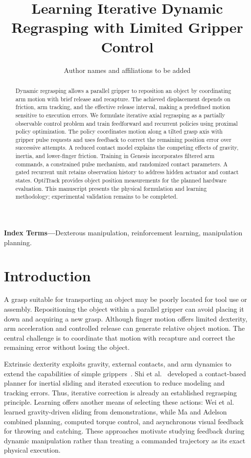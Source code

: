 \documentclass[letterpaper,10pt,conference]{ieeeconf}
\title{Learning Iterative Dynamic Regrasping with Limited Gripper Control}
\author{Author names and affiliations to be added}
\begin{document}
\maketitle
\thispagestyle{empty}
\pagestyle{empty}

\begin{abstract}
Dynamic regrasping allows a parallel gripper to reposition an object by coordinating arm motion with brief release and recapture. The achieved displacement depends on friction, arm tracking, and the effective release interval, making a predefined motion sensitive to execution errors. We formulate iterative axial regrasping as a partially observable control problem and train feedforward and recurrent policies using proximal policy optimization. The policy coordinates motion along a tilted grasp axis with gripper pulse requests and uses feedback to correct the remaining position error over successive attempts. A reduced contact model explains the competing effects of gravity, inertia, and lower-finger friction. Training in Genesis incorporates filtered arm commands, a constrained pulse mechanism, and randomized contact parameters. A gated recurrent unit retains observation history to address hidden actuator and contact states. OptiTrack provides object position measurements for the planned hardware evaluation. This manuscript presents the physical formulation and learning methodology; experimental validation remains to be completed.
\end{abstract}

\noindent\textbf{Index Terms---}Dexterous manipulation, reinforcement learning, manipulation planning.

\section{Introduction}
A grasp suitable for transporting an object may be poorly located for tool use or assembly. Repositioning the object within a parallel gripper can avoid placing it down and acquiring a new grasp. Although finger motion offers limited dexterity, arm acceleration and controlled release can generate relative object motion. The central challenge is to coordinate that motion with recapture and correct the remaining error without losing the object.

Extrinsic dexterity exploits gravity, external contacts, and arm dynamics to extend the capabilities of simple grippers~\cite{dafle2014extrinsic}. Shi et al.~\cite{shi2017sliding} developed a contact-based planner for inertial sliding and iterated execution to reduce modeling and tracking errors. Thus, iterative correction is already an established regrasping principle. Learning offers another means of selecting these actions: Wei et al.~\cite{wei2023regrasp} learned gravity-driven sliding from demonstrations, while Ma and Adelson~\cite{ma2025dynamic} combined planning, computed torque control, and asynchronous visual feedback for throwing and catching. These approaches motivate studying feedback during dynamic manipulation rather than treating a commanded trajectory as its exact physical execution.
\end{document}
